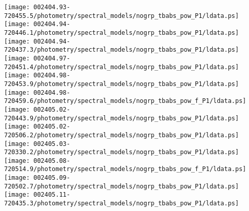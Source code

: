\documentclass{aastex}
\begin{document}
\begin{figure*}[!ht]
\centering
\texttt{[image: 002404.93-720455.5/photometry/spectral\_models/nogrp\_tbabs\_pow\_P1/ldata.ps]} \hfill 
\texttt{[image: 002404.94-720446.1/photometry/spectral\_models/nogrp\_tbabs\_pow\_P1/ldata.ps]} \hfill 
\texttt{[image: 002404.94-720437.3/photometry/spectral\_models/nogrp\_tbabs\_pow\_P1/ldata.ps]} \\ 
\vspace*{0.5in}
\texttt{[image: 002404.97-720451.4/photometry/spectral\_models/nogrp\_tbabs\_pow\_P1/ldata.ps]} \hfill 
\texttt{[image: 002404.98-720453.9/photometry/spectral\_models/nogrp\_tbabs\_pow\_P1/ldata.ps]} \hfill 
\texttt{[image: 002404.98-720459.6/photometry/spectral\_models/nogrp\_tbabs\_pow\_f\_P1/ldata.ps]} \\ 
\vspace*{0.5in}
\texttt{[image: 002405.02-720443.9/photometry/spectral\_models/nogrp\_tbabs\_pow\_P1/ldata.ps]} \hfill 
\texttt{[image: 002405.02-720506.2/photometry/spectral\_models/nogrp\_tbabs\_pow\_P1/ldata.ps]} \hfill 
\texttt{[image: 002405.03-720330.2/photometry/spectral\_models/nogrp\_tbabs\_pow\_P1/ldata.ps]} \\ 
\vspace*{0.5in}
\texttt{[image: 002405.08-720514.9/photometry/spectral\_models/nogrp\_tbabs\_pow\_f\_P1/ldata.ps]} \hfill 
\texttt{[image: 002405.09-720502.7/photometry/spectral\_models/nogrp\_tbabs\_pow\_P1/ldata.ps]} \hfill 
\texttt{[image: 002405.11-720435.3/photometry/spectral\_models/nogrp\_tbabs\_pow\_P1/ldata.ps]} \\ 
\vspace*{0.5in}
\end{figure*}
\clearpage
\end{document}
